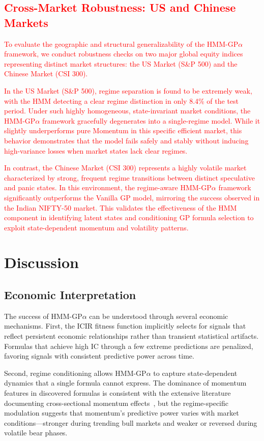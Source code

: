 \documentclass{ieeeaccess}
\newcommand{\revised}[1]{\textcolor{red}{#1}}
\begin{document}
\subsection{\revised{Cross-Market Robustness: US and Chinese Markets}}
\label{sec:cross_market}
\revised{To evaluate the geographic and structural generalizability of the HMM-GP$\alpha$ framework, we conduct robustness checks on two major global equity indices representing distinct market structures: the US Market (S\&P 500) and the Chinese Market (CSI 300).}

\revised{In the US Market (S\&P 500), regime separation is found to be extremely weak, with the HMM detecting a clear regime distinction in only 8.4\% of the test period. Under such highly homogeneous, state-invariant market conditions, the HMM-GP$\alpha$ framework gracefully degenerates into a single-regime model. While it slightly underperforms pure Momentum in this specific efficient market, this behavior demonstrates that the model fails safely and stably without inducing high-variance losses when market states lack clear regimes.}

\revised{In contrast, the Chinese Market (CSI 300) represents a highly volatile market characterized by strong, frequent regime transitions between distinct speculative and panic states. In this environment, the regime-aware HMM-GP$\alpha$ framework significantly outperforms the Vanilla GP model, mirroring the success observed in the Indian NIFTY-50 market. This validates the effectiveness of the HMM component in identifying latent states and conditioning GP formula selection to exploit state-dependent momentum and volatility patterns.}


\section{Discussion}
\label{sec:discussion}

\subsection{Economic Interpretation}
The success of HMM-GP$\alpha$ can be understood through several economic mechanisms. First, the ICIR fitness function implicitly selects for signals that reflect persistent economic relationships rather than transient statistical artifacts. Formulas that achieve high IC through a few extreme predictions are penalized, favoring signals with consistent predictive power across time.

Second, regime conditioning allows HMM-GP$\alpha$ to capture state-dependent dynamics that a single formula cannot express. The dominance of momentum features in discovered formulas is consistent with the extensive literature documenting cross-sectional momentum effects~\cite{b21}, but the regime-specific modulation suggests that momentum's predictive power varies with market conditions---stronger during trending bull markets and weaker or reversed during volatile bear phases.
\end{document}
